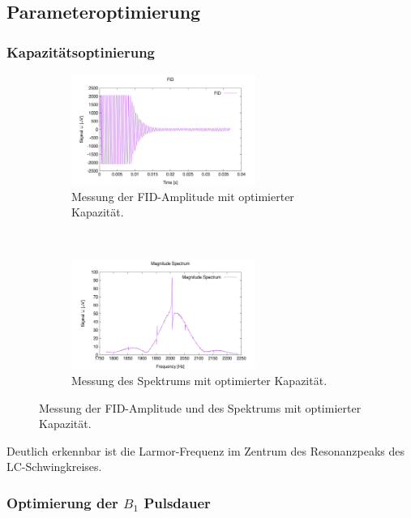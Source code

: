 \documentclass{article}
\begin{document}
    \subsection{Parameteroptimierung}
        \subsubsection*{Kapazitätsoptinierung}

            \begin{figure}
                \centering
                \begin{subfigure}[t]{0.45\textwidth}
                    \centering
                    \includegraphics[width=6cm]{../Bilddateien/C_Opti_FID.png}
                    \caption{Messung der FID-Amplitude mit optimierter Kapazität.}
                \end{subfigure}
                \
                \begin{subfigure}[t]{0.45\textwidth}
                    \centering
                    \includegraphics[width=6cm]{../Bilddateien/C_Opti_Spectrum.png}
                    \caption{Messung des Spektrums mit optimierter Kapazität.}
                \end{subfigure}
                \caption{Messung der FID-Amplitude und des Spektrums mit optimierter Kapazität.}
            \end{figure}
            Deutlich erkennbar ist die Larmor-Frequenz im Zentrum des Resonanzpeaks des LC-Schwingkreises. 

        \subsubsection*{Optimierung der $B_1$ Pulsdauer}
\end{document}
